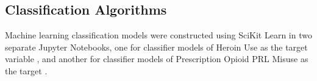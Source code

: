 \documentclass[sigconf]{acmart}
\begin{document}
\subsection{Classification Algorithms}
Machine learning classification models were constructed using SciKit Learn 
\cite{muller17, raschka17} in two separate Jupyter Notebooks, one for 
classifier models of Heroin Use as the target variable \cite{classifyH}, and 
another for classifier models of Prescription Opioid PRL Misuse as the target 
\cite{classifyPRL}. 



\end{document}
